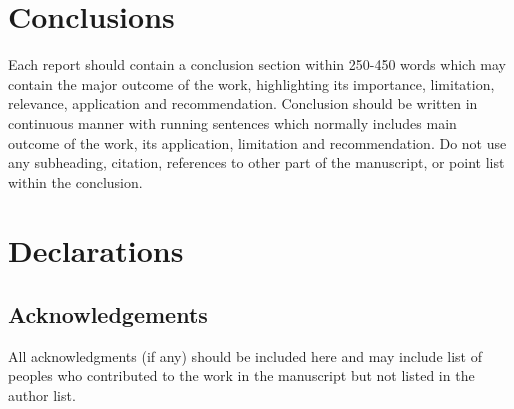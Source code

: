 \documentclass[11pt,twocolumn]{article}
\begin{document}
 

\section{Conclusions}

Each report should contain a conclusion section within 250-450 words which may contain the major outcome of the work, highlighting its importance, limitation, relevance, application and recommendation. Conclusion should be written in continuous manner with running sentences which normally includes main outcome of the work, its application, limitation and recommendation. Do not use any subheading, citation, references to other part of the manuscript, or point list within the conclusion.

\section{Declarations}
\subsection{Acknowledgements}
All acknowledgments (if any) should be included here and may include list of peoples who contributed to the work in the manuscript but not listed in the author list. 
\cite{groisser2019geometry}




\end{document}
